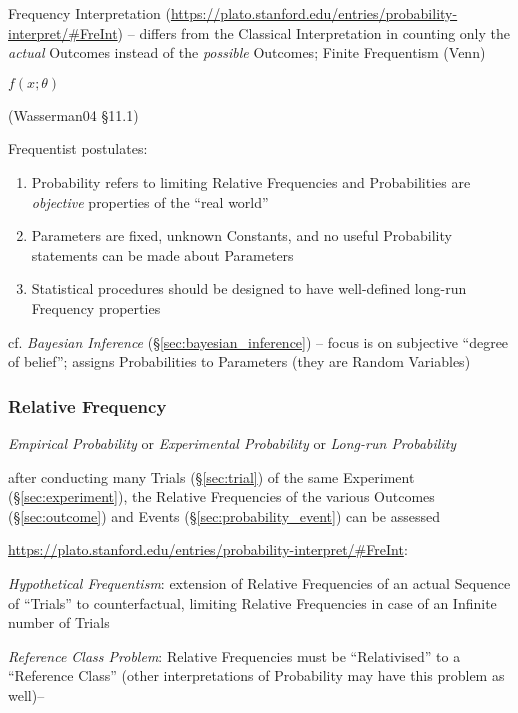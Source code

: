 Frequency Interpretation
(\url{https://plato.stanford.edu/entries/probability-interpret/#FreInt}) --
differs from the Classical Interpretation in counting only the \emph{actual}
Outcomes instead of the \emph{possible} Outcomes; Finite Frequentism (Venn)

$f(x; \theta)$

(Wasserman04 \S11.1)

Frequentist postulates:
\begin{enumerate}
  \item Probability refers to limiting Relative Frequencies and Probabilities
    are \emph{objective} properties of the ``real world''
  \item Parameters are fixed, unknown Constants, and no useful Probability
    statements can be made about Parameters
  \item Statistical procedures should be designed to have well-defined long-run
    Frequency properties
\end{enumerate}

cf. \emph{Bayesian Inference} (\S\ref{sec:bayesian_inference}) -- focus is on
subjective ``degree of belief''; assigns Probabilities to Parameters (they are
Random Variables)



\subsubsection{Relative Frequency}\label{sec:relative_frequency}

\emph{Empirical Probability} or \emph{Experimental Probability} or
\emph{Long-run Probability}

after conducting many Trials (\S\ref{sec:trial}) of the same Experiment
(\S\ref{sec:experiment}), the Relative Frequencies of the various Outcomes
(\S\ref{sec:outcome}) and Events (\S\ref{sec:probability_event}) can be assessed

\url{https://plato.stanford.edu/entries/probability-interpret/#FreInt}:

\emph{Hypothetical Frequentism}: extension of Relative Frequencies of an actual
Sequence of ``Trials'' to counterfactual, limiting Relative Frequencies in case
of an Infinite number of Trials

\emph{Reference Class Problem}: Relative Frequencies must be ``Relativised'' to
a ``Reference Class'' (other interpretations of Probability may have this
problem as well)--


